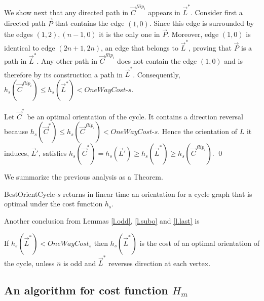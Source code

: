 	We show next that any directed path in $\vec{C}^{flip_i}$ appears in $\vec{L}^*$. Consider first a directed path $\vec{P}$ that contains the edge $(1,0)$. 
	Since this edge is surrounded by the edges $(1,2), (n-1,0)$ it is the only one in $\vec{P}$. Moreover, edge $(1,0)$ is identical to edge $(2n+1,2n)$, an edge that belongs to 
	$\vec{L}^*$, proving that  $\vec{P}$ is a path in $\vec{L}^*$.
	Any other path in $\vec{C}^{flip_i}$ does not contain the edge $(1,0)$ and is therefore by its construction a path in $\vec{L}^*$. 
	Consequently, $h_s(\vec{C}^{flip_i})\leq h_s(\vec{L}^*)<\textit{OneWayCost-s}$.
	
	Let $\vec{C}^*$ be an optimal orientation of the cycle. It contains a direction reversal
	because $h_s(\vec{C}^*)\leq h_s(\vec{C}^{flip_i})<\textit{OneWayCost-s}$.
	Hence the orientation of $L$ it induces, $\vec{L}'$, satisfies
	$h_s(\vec{C}^*)=h_s(\vec{L}')\geq h_s(\vec{L}^*)\geq h_s(\vec{C}^{flip_i})$.
\qed

We summarize the previous analysis as a Theorem.
\begin{theorem}\label{t.cycle-s}
	BestOrientCycle-$s$  returns  in linear time an orientation for a cycle graph that is optimal under the cost function $h_s$.
\end{theorem}

Another conclusion from Lemmas \ref{l.odd}, \ref{l.subo} and \ref{l.last} is
\begin{corollary}
	If $h_s(\vec{L}^*) < {OneWayCost_s}$ then $h_s(\vec{L}^*)$ is the cost of an optimal orientation of the cycle, unless $n$ is odd and $\vec{L}^*$ reverses direction at each vertex.
\end{corollary}

\subsection{An algorithm for cost function $H_m$}\label{s.c}

